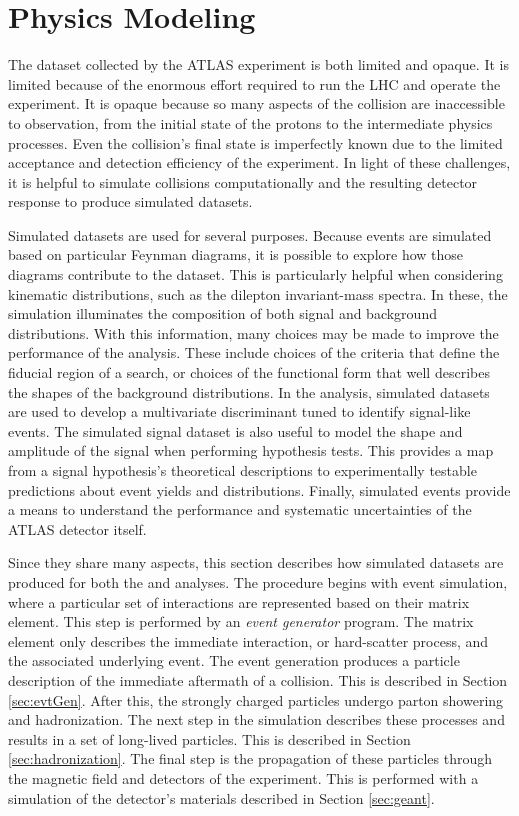 \section{Physics Modeling}

The dataset collected by the ATLAS experiment is both limited and opaque.
It is limited because of the enormous effort required to run the LHC and operate the experiment.
It is opaque because so many aspects of the collision are inaccessible to observation, from the initial state of the protons to the intermediate physics processes.
Even the collision's final state is imperfectly known due to the limited acceptance and detection efficiency of the experiment.
In light of these challenges, it is helpful to simulate collisions computationally and the resulting detector response to produce simulated datasets.

Simulated datasets are used for several purposes.
Because events are simulated based on particular Feynman diagrams, it is possible to explore how those diagrams contribute to the dataset.
This is particularly helpful when considering kinematic distributions, such as the dilepton invariant-mass spectra.
In these, the simulation illuminates the composition of both signal and background distributions.
With this information, many choices may be made to improve the performance of the analysis.
These include choices of the criteria that define the fiducial region of a search, or choices of the functional form that well describes the shapes of the background distributions.
In the \hmm analysis, simulated datasets are used to develop a multivariate discriminant tuned to identify signal-like events.
The simulated signal dataset is also useful to model the shape and amplitude of the signal when performing hypothesis tests.
This provides a map from a signal hypothesis's theoretical descriptions to experimentally testable predictions about event yields and distributions.
Finally, simulated events provide a means to understand the performance and systematic uncertainties of the ATLAS detector itself.

Since they share many aspects, this section describes how simulated datasets are produced for both the \hmm and \nr analyses.
The procedure begins with event simulation, where a particular set of interactions are represented based on their matrix element.
This step is performed by an \emph{event generator} program.
The matrix element only describes the immediate interaction, or hard-scatter process, and the associated underlying event.
The event generation produces a particle description of the immediate aftermath of a collision. This is described in Section \ref{sec:evtGen}.
After this, the strongly charged particles undergo parton showering and hadronization.
The next step in the simulation describes these processes and results in a set of long-lived particles. This is described in Section \ref{sec:hadronization}.
The final step is the propagation of these particles through the magnetic field and detectors of the experiment.
This is performed with a simulation of the detector's materials described in Section \ref{sec:geant}.

